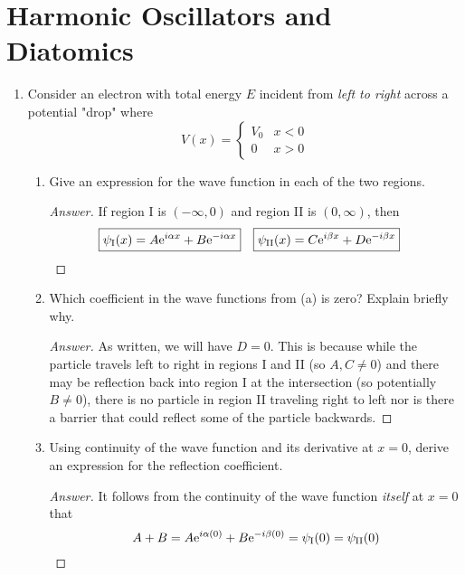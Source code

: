 \documentclass[../psets.tex]{subfiles}
\begin{document}
\section{Harmonic Oscillators and Diatomics}
\begin{enumerate}
    \item {}Consider an electron with total energy $E$ incident from \emph{left to right} across a potential "drop" where
    \begin{equation*}
        V(x) =
        \begin{cases}
            V_0 & x<0\\
            0   & x>0
        \end{cases}
    \end{equation*}
    \begin{enumerate}
        \item Give an expression for the wave function in each of the two regions.
        \begin{proof}[Answer]
            If region I is $(-\infty,0)$ and region II is $(0,\infty)$, then
            \begin{align*}
                \Aboxed{\psi_\text{I}(x)  &= A\e[i\alpha x]+B\e[-i\alpha x]}&
                \Aboxed{\psi_\text{II}(x) &= C\e[i\beta x]+D\e[-i\beta x]}
            \end{align*}
        \end{proof}
        \item Which coefficient in the wave functions from (a) is zero? Explain briefly why.
        \begin{proof}[Answer]
            As written, we will have $\boxed{D=0}$. This is because while the particle travels left to right in regions I and II (so $A,C\neq 0$) and there may be reflection back into region I at the intersection (so potentially $B\neq 0$), there is no particle in region II traveling right to left nor is there a barrier that could reflect some of the particle backwards.
        \end{proof}
        \item Using continuity of the wave function and its derivative at $x=0$, derive an expression for the reflection coefficient.
        \begin{proof}[Answer]
            It follows from the continuity of the wave function \emph{itself} at $x=0$ that
            \begin{equation*}
                A+B = A\e[i\alpha(0)]+B\e[-i\beta(0)]
                = \psi_\text{I}(0)
                = \psi_\text{II}(0)

\end{equation*}
\end{proof}
\end{enumerate}
\end{enumerate}
\end{document}
